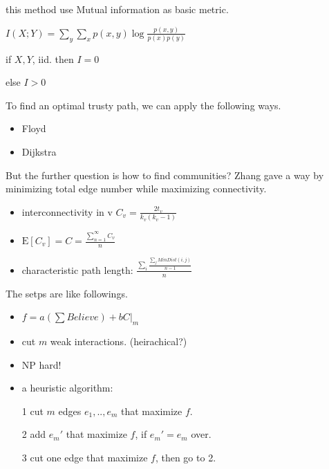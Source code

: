 \documentclass[UTF8, 11pt, a4paper]{ctexart}
\begin{document}
this method use Mutual information as basic metric.

$I(X;Y) = \sum_y \sum_x  p(x,y) \log \frac{p(x,y)}{p(x)p(y)} $

if $X, Y$, iid. then $ I=0$

else $ I > 0 $

To find an optimal trusty path, we can apply the following ways.
\begin{itemize}
\item Floyd
\item Dijkstra
\end{itemize}
But the further question is how to find communities?
Zhang gave a way by minimizing total edge number while maximizing connectivity.  
\begin{itemize}
\item interconnectivity in v $C_v = \frac{2t_v}{k_v(k_v-1)} $
\item $\text{E}[C_v]=C=\frac{\sum_{n=1}^{\infty} C_v}{n} $
\item characteristic path length: $\frac{\sum_i \frac{\sum_j MinDist(i,j)}{n-1}  }{n} $
\end{itemize}
The setps are like followings.
\begin{itemize}
\item $ f = a \left( \sum Believe \right) + b C|_m $
\item cut $m$ weak interactions. (heirachical?)
\item {\color{red} NP hard!}
\item a heuristic algorithm:
 \item [1] cut $m$ edges $e_1,..,e_m$ that maximize $f$.
 \item [2]  add $e_m'$ that maximize $f$, if $e_m' =e_m$ over.
 \item [3] cut one edge that maximize $f$, then go to 2.
\end{itemize}
\end{document}
